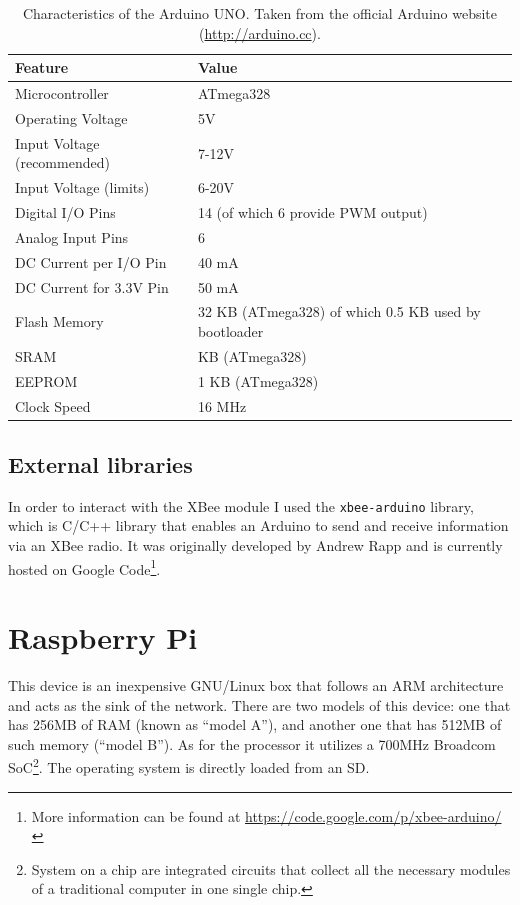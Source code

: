 \begin{table}[ht] 
\centering
\begin{tabular}{l|l}
    Feature     & Value\\
\hline
Microcontroller	& ATmega328\\
Operating Voltage &	5V\\
Input Voltage (recommended) & 7-12V\\
Input Voltage (limits) & 6-20V\\
Digital I/O Pins & 14 (of which 6 provide PWM output)\\
Analog Input Pins & 6\\
DC Current per I/O Pin & 40 mA\\
DC Current for 3.3V Pin & 50 mA\\
Flash Memory & 32 KB (ATmega328) of which 0.5 KB used by bootloader\\
SRAM & KB (ATmega328)\\
EEPROM &	1 KB (ATmega328)\\
Clock Speed &	16 MHz\\
\end{tabular}
\caption{Characteristics of the Arduino UNO. Taken from the official Arduino website (\url{http://arduino.cc}).}
\label{tab:arduinofeatures}
\end{table}

\subsection{External libraries}
In order to interact with the XBee module I used the \texttt{xbee-arduino} library, which is C/C++ library that enables an Arduino to send and receive information via an XBee\textregistered{} radio. It was originally developed by Andrew Rapp and is currently hosted on Google Code\footnote{More information can be found at \url{https://code.google.com/p/xbee-arduino/}}.


\section{Raspberry Pi}

This device is an inexpensive GNU/Linux box that follows an ARM architecture and acts as the sink of the network. There are two models of this device: one that has 256MB of RAM (known as ``model A''), and another one that has 512MB of such memory (``model B''). As for the processor it utilizes a 700MHz Broadcom SoC\footnote{System on a chip are integrated circuits that collect all the necessary modules of a traditional computer in one single chip.}. The operating system is directly loaded from an SD.

